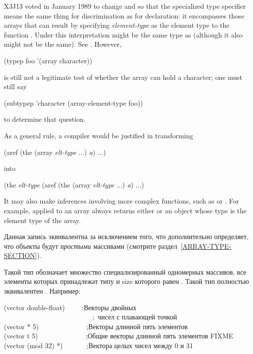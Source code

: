 \begin{flushdesc}
\begin{new}
X3J13 voted in January 1989
to change  and 
so that the specialized  type specifier
means the same thing for discrimination
as for declaration: it encompasses those arrays
that can result by specifying \emph{element-type} as the element type
to the function .
Under this interpretation  might be
the same type as 
(although it also might not be the same).
See .
However,
\begin{lisp}
(typep foo '(array character))
\end{lisp}
is still not a legitimate test of whether the array
 can hold a character; one must still say
\begin{lisp}
(subtypep 'character (array-element-type foo))
\end{lisp}
to determine that question.

As a general rule, a compiler would be justified in transforming
\begin{lisp}
(aref (the (array \emph{elt-type} ...) \emph{a}) ...)
\end{lisp}
into
\begin{lisp}
(the \emph{elt-type} (aref (the (array \emph{elt-type} ...) \emph{a}) ...)
\end{lisp}
It may also make inferences involving more complex functions,
such as  or .
For example,  applied to an array always returns either 
or an object whose type is the element type of the array.
\end{new}

\item[\cd{(simple-array \emph{element-type} \emph{sizes})}]
  Данная запись эквивалентна  за
  исключением того, что дополнительно определяет, что объекты будут \emph{простыми}
  массивами (смотрите раздел~\ref{ARRAY-TYPE-SECTION}).

\item[\cd{(vector \emph{element-type} \emph{size})}]
  Такой тип обозначает множество специализированный одномерных массивов, все элементы
  которых принадлежат типу  и size которого равен
  . Такой тип полностью эквивалентен .
  Например:
  \begin{lisp}
    (vector double-float)~~~~~;\textrm{Векторы двойных } \\
    ~~~~~~~~~~~~~~~~~~~~~~~~~~;~\textrm{чисел с плавающей точкой} \\
    (vector * 5)~~~~~~~~~~~~~~;\textrm{Векторы длинной пять элементов} \\
    (vector t 5)~~~~~~~~~~~~~~;\textrm{Общие векторы длинной пять элементов FIXME} \\
    (vector (mod 32) *)~~~~~~~;\textrm{Вектора целых чисел между 0 и 31}
  \end{lisp}


\end{flushdesc}
